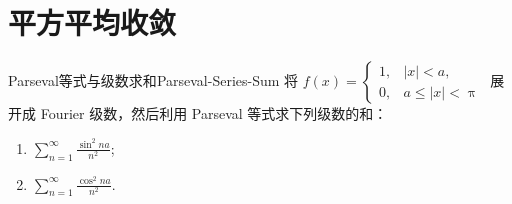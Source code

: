 \section{平方平均收敛}

\begin{problem}{Parseval等式与级数求和}{Parseval-Series-Sum}
    将 $f(x) = \begin{cases} 1, & |x| < a, \\ 0, & a \leqslant |x| < \uppi \end{cases}$ 展开成 Fourier 级数，然后利用 Parseval 等式求下列级数的和：
    \begin{enumerate}
        \item $\sum_{n=1}^{\infty} \frac{\sin^2 na}{n^2}$;
        \item $\sum_{n=1}^{\infty} \frac{\cos^2 na}{n^2}$.
    \end{enumerate}
\end{problem}

